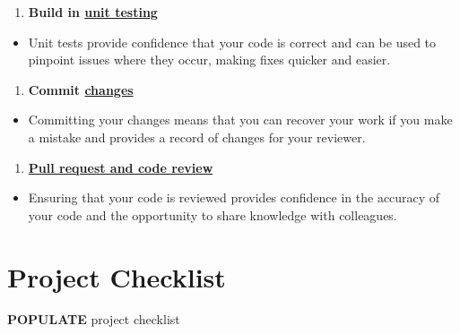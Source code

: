 \documentclass[]{book}
\providecommand{\tightlist}{%
  \setlength{\itemsep}{0pt}\setlength{\parskip}{0pt}}
\begin{document}
\begin{enumerate}
\def\labelenumi{\arabic{enumi}.}
\setcounter{enumi}{4}
\tightlist
\item
  \textbf{Build in \protect\hyperlink{unittest}{unit testing}}\\
\end{enumerate}

\begin{itemize}
\tightlist
\item
  Unit tests provide confidence that your code is correct and can be used to pinpoint issues where they occur, making fixes quicker and easier.\\
\end{itemize}

\begin{enumerate}
\def\labelenumi{\arabic{enumi}.}
\setcounter{enumi}{5}
\tightlist
\item
  \textbf{Commit \protect\hyperlink{versioncontrol}{changes}}\\
\end{enumerate}

\begin{itemize}
\tightlist
\item
  Committing your changes means that you can recover your work if you make a mistake and provides a record of changes for your reviewer.\\
\end{itemize}

\begin{enumerate}
\def\labelenumi{\arabic{enumi}.}
\setcounter{enumi}{6}
\tightlist
\item
  \textbf{\protect\hyperlink{review}{Pull request and code review}}\\
\end{enumerate}

\begin{itemize}
\tightlist
\item
  Ensuring that your code is reviewed provides confidence in the accuracy of your code and the opportunity to share knowledge with colleagues.
\end{itemize}

\hypertarget{checklist}{%
\chapter{Project Checklist}\label{checklist}}

\textbf{POPULATE} project checklist
\end{document}
